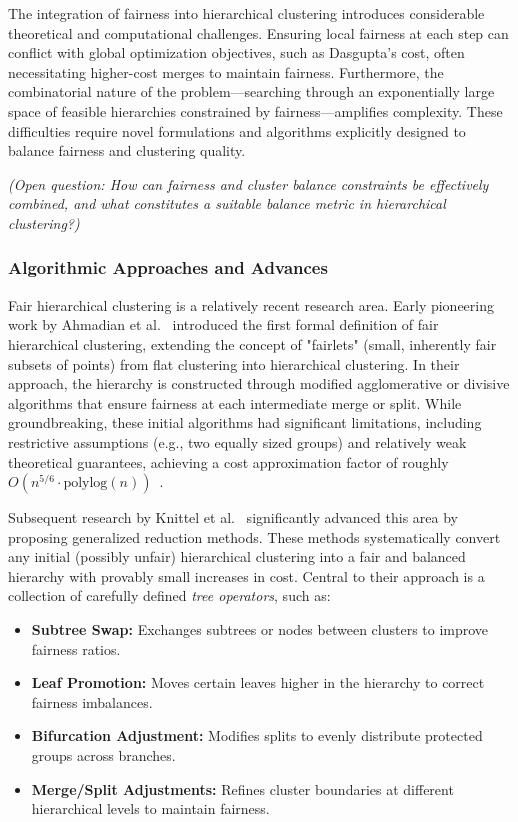 The integration of fairness into hierarchical clustering introduces considerable theoretical and computational challenges. Ensuring local fairness at each step can conflict with global optimization objectives, such as Dasgupta's cost, often necessitating higher-cost merges to maintain fairness. Furthermore, the combinatorial nature of the problem—searching through an exponentially large space of feasible hierarchies constrained by fairness—amplifies complexity. These difficulties require novel formulations and algorithms explicitly designed to balance fairness and clustering quality.

\emph{(Open question: How can fairness and cluster balance constraints be effectively combined, and what constitutes a suitable balance metric in hierarchical clustering?)}

\subsubsection{Algorithmic Approaches and Advances}

Fair hierarchical clustering is a relatively recent research area. Early pioneering work by Ahmadian et al.~\cite{ahmadian2020fairhc} introduced the first formal definition of fair hierarchical clustering, extending the concept of "fairlets" (small, inherently fair subsets of points) from flat clustering into hierarchical clustering. In their approach, the hierarchy is constructed through modified agglomerative or divisive algorithms that ensure fairness at each intermediate merge or split. While groundbreaking, these initial algorithms had significant limitations, including restrictive assumptions (e.g., two equally sized groups) and relatively weak theoretical guarantees, achieving a cost approximation factor of roughly \( O(n^{5/6}\cdot\text{polylog}(n)) \)~\cite{ahmadian2020fairhc}.

Subsequent research by Knittel et al.~\cite{knittel2023generalized} significantly advanced this area by proposing generalized reduction methods. These methods systematically convert any initial (possibly unfair) hierarchical clustering into a fair and balanced hierarchy with provably small increases in cost. Central to their approach is a collection of carefully defined \emph{tree operators}, such as:

\begin{itemize}
    \item \textbf{Subtree Swap:} Exchanges subtrees or nodes between clusters to improve fairness ratios.
    \item \textbf{Leaf Promotion:} Moves certain leaves higher in the hierarchy to correct fairness imbalances.
    \item \textbf{Bifurcation Adjustment:} Modifies splits to evenly distribute protected groups across branches.
    \item \textbf{Merge/Split Adjustments:} Refines cluster boundaries at different hierarchical levels to maintain fairness.
\end{itemize}

